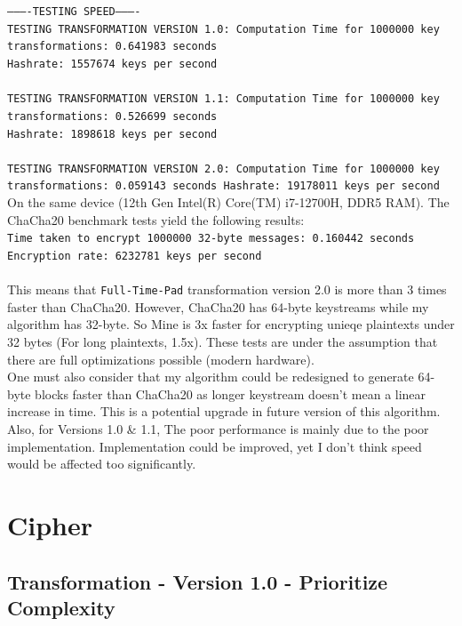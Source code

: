\documentclass[fleqn, a4paper,12pt]{article}
\begin{document}
\texttt{----------TESTING SPEED----------\\
TESTING TRANSFORMATION VERSION 1.0: Computation Time for 1000000 key transformations: 0.641983 seconds\\
Hashrate: 1557674 keys per second\\
\\
TESTING TRANSFORMATION VERSION 1.1: Computation Time for 1000000 key transformations: 0.526699 seconds\\
Hashrate: 1898618 keys per second\\
\\
TESTING TRANSFORMATION VERSION 2.0: Computation Time for 1000000 key transformations: 0.059143 seconds
Hashrate: 19178011 keys per second
}
\\
On the same device (12th Gen Intel(R) Core(TM) i7-12700H, DDR5 RAM). The ChaCha20 benchmark tests yield the following results:\\
\texttt{Time taken to encrypt 1000000 32-byte messages: 0.160442 seconds\\
Encryption rate: 6232781 keys per second}\\
\\
This means that \texttt{Full-Time-Pad} transformation version 2.0 is more than 3 times faster than ChaCha20. However, ChaCha20 has 64-byte keystreams while my algorithm has 32-byte. So Mine is 3x faster for encrypting unieqe plaintexts under 32 bytes (For long plaintexts, 1.5x). These tests are under the assumption that there are full optimizations possible (modern hardware).
\\
One must also consider that my algorithm could be redesigned to generate 64-byte blocks faster than ChaCha20 as longer keystream doesn't mean a linear increase in time. This is a potential upgrade in future version of this algorithm.
\\
Also, for Versions 1.0 \& 1.1, The poor performance is mainly due to the poor implementation. Implementation could be improved, yet I don't think speed would be affected too significantly.

\section {Cipher}

\subsection{Transformation - Version 1.0 - Prioritize Complexity}
\end{document}
